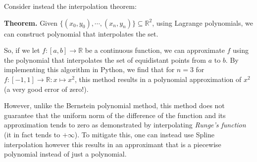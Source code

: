 \documentclass[landscape,final,a0paper]{baposter}
\begin{document}
\begin{poster}
{\vspace{-2mm}
Consider instead the interpolation theorem:

\textbf{Theorem.} Given $\{(x_0, y_0), \cdots, (x_n, y_n) \} \subseteq \mathbb{R}^2$, using Lagrange polynomials, we can construct polynomial that interpolates the set. \cite{humph}

\vspace{2mm}
So, if we let $f : [a, b] \to \mathbb{R}$ be a continuous function, we can approximate $f$ using the polynomial that interpolates the set of equidistant points from $a$ to $b$. By implementing this algorithm in Python, we find that for $n = 3$ for $f : [-1, 1] \to \mathbb{R}: x \mapsto x^2$, this method results in a polynomial approximation of $x^2$ (a very good error of zero!). 

However, unlike the Bernstein polynomial method, this method does not guarantee that the uniform norm of the difference of the function and its approximation tends to zero as demonstrated by interpolating \textit{Runge's function} (it in fact tends to $+ \infty$). To mitigate this, one can instead use Spline interpolation however this results in an approximant that is a piecewise polynomial instead of just a polynomial.

  \vspace{0.2em}
  }  

\end{poster}
\end{document}
